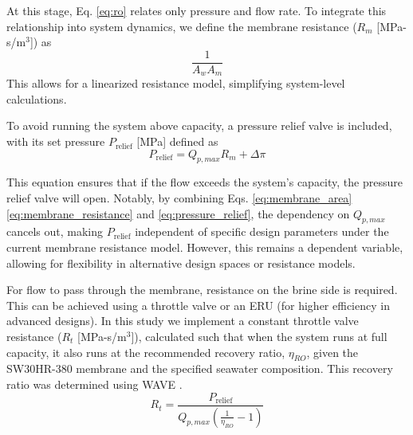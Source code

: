 \documentclass[twocolumn,10pt]{asme2e}
\begin{document}
At this stage, Eq. \ref{eq:ro} relates only pressure and flow rate. To integrate this relationship into system dynamics, we define the membrane resistance ($R_m$ [MPa-s/m$^3$]) as
\begin{equation}
    \frac{1}{A_w A_m}
    \label{eq:membrane_resistance}
\end{equation}
\noindent This allows for a linearized resistance model, simplifying system-level calculations.

To avoid running the system above capacity, a pressure relief valve is included, with its set pressure $P_{\text{relief}}$ [MPa] defined as
\begin{equation}
    P_{\text{relief}} = Q_{p,max}R_m + \Delta \pi
    \label{eq:pressure_relief}
\end{equation}

This equation ensures that if the flow exceeds the system's capacity, the pressure relief valve will open. Notably, by combining Eqs. \ref{eq:membrane_area} \ref{eq:membrane_resistance} and \ref{eq:pressure_relief}, the dependency on $Q_{p,max}$ cancels out, making $P_{\text{relief}}$ independent of specific design parameters under the current membrane resistance model. However, this remains a dependent variable, allowing for flexibility in alternative design spaces or resistance models.

For flow to pass through the membrane, resistance on the brine side is required. This can be achieved using a throttle valve or an ERU (for higher efficiency in advanced designs). In this study we implement a constant throttle valve resistance ($R_t$ [MPa-s/m$^3$]), calculated such that when the system runs at full capacity, it also runs at the recommended recovery ratio, $\eta_{RO}$, given the SW30HR-380 membrane and the specified seawater composition. This recovery ratio was determined using WAVE \cite{wave}.
\begin{equation}
    R_t = \frac{P_{\text{relief}}}{Q_{p,max}(\frac{1}{\eta_{RO}} - 1)}
\end{equation}
\end{document}
